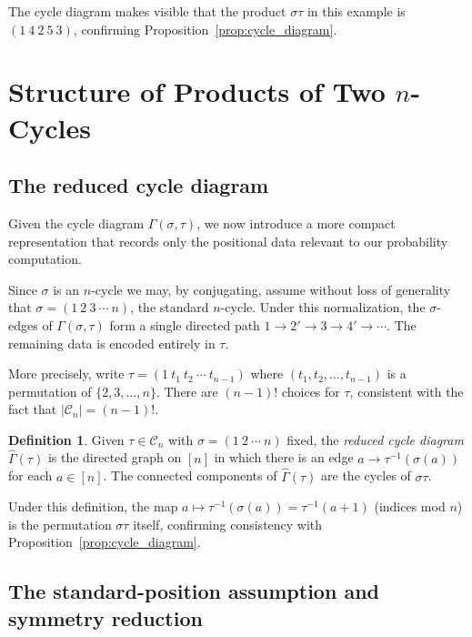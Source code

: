 \documentclass[12pt,a4paper]{article}
\theoremstyle{definition}
\newtheorem{definition}[theorem]{Definition}
\newcommand{\Cn}{\mathcal{C}_n}
\newcommand{\abs}[1]{\lvert #1 \rvert}
\begin{document}
The cycle diagram makes visible that the product $\sigma\tau$ in this
example is $(1\ 4\ 2\ 5\ 3)$, confirming Proposition~\ref{prop:cycle_diagram}.

\section{Structure of Products of Two \texorpdfstring{$n$}{n}-Cycles}
\label{sec:product_structure}

\subsection{The reduced cycle diagram}

Given the cycle diagram $\Gamma(\sigma,\tau)$, we now introduce a more
compact representation that records only the positional data relevant
to our probability computation.

Since $\sigma$ is an $n$-cycle we may, by conjugating, assume without
loss of generality that $\sigma = (1\ 2\ 3\ \cdots\ n)$, the standard
$n$-cycle.  Under this normalization, the $\sigma$-edges of
$\Gamma(\sigma,\tau)$ form a single directed path $1\to 2'\to 3\to
4'\to\cdots$.  The remaining data is encoded entirely in $\tau$.

More precisely, write $\tau = (1\ t_1\ t_2\ \cdots\ t_{n-1})$ where
$(t_1,t_2,\dots,t_{n-1})$ is a permutation of $\{2,3,\dots,n\}$.
There are $(n-1)!$ choices for $\tau$, consistent with the fact that
$\abs{\Cn}=(n-1)!$.

\begin{definition}
\label{def:reduced}
Given $\tau\in\Cn$ with $\sigma=(1\ 2\ \cdots\ n)$ fixed, the
\emph{reduced cycle diagram} $\widehat\Gamma(\tau)$ is the directed
graph on $[n]$ in which there is an edge $a\to\tau^{-1}(\sigma(a))$
for each $a\in[n]$.  The connected components of $\widehat\Gamma(\tau)$
are the cycles of $\sigma\tau$.
\end{definition}

Under this definition, the map $a\mapsto \tau^{-1}(\sigma(a)) =
\tau^{-1}(a+1)$ (indices mod $n$) is the permutation $\sigma\tau$
itself, confirming consistency with Proposition~\ref{prop:cycle_diagram}.

\subsection{The standard-position assumption and symmetry reduction}
\end{document}

